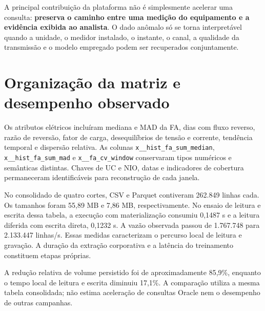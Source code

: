 A principal contribuição da plataforma não é simplesmente acelerar uma consulta: \textbf{preserva o caminho entre uma medição do equipamento e a evidência exibida ao analista}. O dado anômalo só se torna interpretável quando a unidade, o medidor instalado, o instante, o canal, a qualidade da transmissão e o modelo empregado podem ser recuperados conjuntamente.


\section{Organização da matriz e desempenho observado}
Os atributos elétricos incluíram mediana e MAD da FA, dias com fluxo reverso, razão de reversão, fator de carga, desequilíbrios de tensão e corrente, tendência temporal e dispersão relativa. As colunas \texttt{x\_\_hist\_fa\_sum\_median}, \texttt{x\_\_hist\_fa\_sum\_mad} e \texttt{x\_\_fa\_cv\_window} conservaram tipos numéricos e semânticas distintas. Chaves de UC e NIO, datas e indicadores de cobertura permaneceram identificáveis para reconstrução de cada janela.

No consolidado de quatro cortes, CSV e Parquet contiveram 262.849 linhas cada. Os tamanhos foram 55,89 MB e 7,86 MB, respectivamente. No ensaio de leitura e escrita dessa tabela, a execução com materialização consumiu 0,1487 s e a leitura diferida com escrita direta, 0,1232 s. A vazão observada passou de 1.767.748 para 2.133.447 linhas/s. Essas medidas caracterizam o percurso local de leitura e gravação. A duração da extração corporativa e a latência do treinamento constituem etapas próprias.


A redução relativa de volume persistido foi de aproximadamente 85,9\%, enquanto o tempo local de leitura e escrita diminuiu 17,1\%. A comparação utiliza a mesma tabela consolidada; não estima aceleração de consultas Oracle nem o desempenho de outras campanhas.


